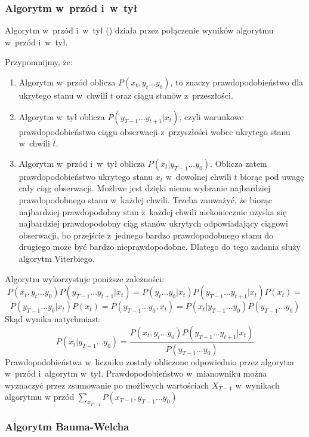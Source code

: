 \subsubsection{Algorytm w~przód i~w~tył}
Algorytm w~przód i~w~tył () działa przez połączenie wyników algorytmu w~przód i~w~tył.

Przypomnijmy, że:

\begin{enumerate}
    \item Algorytm w~przód oblicza $P(x_t, y_t \dots y_0)$, to znaczy prawdopodobieństwo dla ukrytego stanu w~chwili $t$ oraz ciągu stanów z~przeszłości.
    \item Algorytm w~tył oblicza $P(y_{T-1} \dots y_{t+1} | x_t)$, czyli warunkowe prawdopodobieństwo ciągu obserwacji z~przyszłości wobec ukrytego stanu w~chwili $t$.
    \item Algorytm w~przód i~w~tył oblicza $P(x_t | y_{T-1} \dots y_0)$. Oblicza zatem prawdopodobieństwo ukrytego stanu $x_t$ w~dowolnej chwili $t$ biorąc pod uwagę cały ciąg obserwacji. Możliwe jest dzięki niemu wybranie najbardziej prawdopodobnego stanu w~każdej chwili. Trzeba zauważyć, że biorąc najbardziej prawdopodobny stan z~każdej chwili niekoniecznie uzyska się najbardziej prawdopodobny ciąg stanów ukrytych odpowiadający ciągowi obserwacji, bo przejście z~jednego bardzo prawdopodobnego stanu do drugiego może być bardzo nieprawdopodobne. Dlatego do tego zadania służy algorytm Viterbiego.
\end{enumerate}

Algorytm  wykorzystuje poniższe zależności:
$$P(x_t, y_t \dots y_0) P(y_{T-1} \dots y_{t+1} | x_t) = P(y_t \dots y_0 | x_t) P(y_{T-1} \dots y_{t+1} | x_t) P(x_t) = $$
$$P(y_{T-1} \dots y_0 | x_t) P(x_t) = P(y_{T-1} \dots y_0, x_t) = P(x_t | y_{T-1} \dots y_0) P(y_{T-1} \dots y_0)$$
Skąd wynika natychmiast:
$$P(x_t | y_{T-1} \dots y_0) = \frac{P(x_t, y_t \dots y_0) P(y_{T-1} \dots y_{t+1} | x_t)}{P(y_{T-1} \dots y_0)}$$
Prawdopodobieństwa w~liczniku zostały obliczone odpowiednio przez algorytm w~przód i~algorytm w~tył.
Prawdopodobieństwo w~mianowniku można wyznaczyć przez zsumowanie po możliwych wartościach $X_{T-1}$ w~wynikach algorytmu
w przód $\sum_{x_{T-1}} P(x_{T-1}, y_{T-1} \dots y_0)$

\subsubsection{Algorytm Bauma-Welcha}

